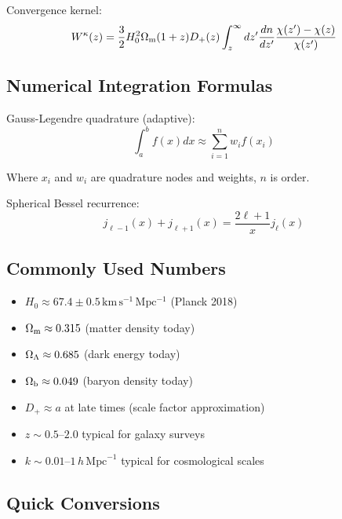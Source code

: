Convergence kernel:
\begin{equation}
W^\kappa(z) = \frac{3}{2} H_0^2 \Omega_{\mathrm{m}} (1+z) D_+(z) \int_z^\infty dz' \frac{dn}{dz'} \frac{\chi(z') - \chi(z)}{\chi(z')}
\label{eq:qr_wkappa}
\end{equation}

\subsection{Numerical Integration Formulas}\label{subsec:qr_numerical}

Gauss-Legendre quadrature (adaptive):
\begin{equation}
\int_a^b f(x) dx \approx \sum_{i=1}^n w_i f(x_i)
\label{eq:qr_quadgk}
\end{equation}

Where $x_i$ and $w_i$ are quadrature nodes and weights, $n$ is order.

Spherical Bessel recurrence:
\begin{equation}
j_{\ell-1}(x) + j_{\ell+1}(x) = \frac{2\ell+1}{x} j_\ell(x)
\label{eq:qr_bessel_recur}
\end{equation}

\subsection{Commonly Used Numbers}\label{subsec:qr_numbers}

\begin{itemize}
    \item $H_0 \approx 67.4 \pm 0.5 \, \mathrm{km \, s^{-1} \, Mpc^{-1}}$ (Planck 2018)
    \item $\Omega_{\mathrm{m}} \approx 0.315$ (matter density today)
    \item $\Omega_{\Lambda} \approx 0.685$ (dark energy today)
    \item $\Omega_{\mathrm{b}} \approx 0.049$ (baryon density today)
    \item $D_+ \approx a$ at late times (scale factor approximation)
    \item $z \sim 0.5$--$2.0$ typical for galaxy surveys
    \item $k \sim 0.01$--$1 \, h \, \mathrm{Mpc}^{-1}$ typical for cosmological scales
\end{itemize}

\subsection{Quick Conversions}\label{subsec:qr_conversions}

